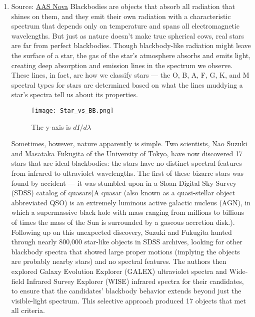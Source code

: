 \documentclass{article}
\begin{document}
\begin{enumerate}
\item Source: \href{https://aasnova.org/2018/10/31/perfect-blackbodies-in-the-sky/}{AAS Nova} \parencite{suzuki2018blackbody}\newline
 Blackbodies are objects that absorb all radiation that shines on them, and they emit their own radiation with a characteristic spectrum that depends only on temperature and spans all electromagnetic wavelengths.\newline
 But just as nature doesn’t make true spherical cows, real stars are far from perfect blackbodies. \newline
 Though blackbody-like radiation might leave the surface of a star, the gas of the star’s atmosphere absorbs and emits light, creating deep absorption and emission lines in the spectrum we observe. These lines, in fact, are how we classify stars — the O, B, A, F, G, K, and M spectral types for stars are determined based on what the lines muddying a star’s spectra tell us about its properties.
 \begin{figure}[H]
 \caption{The y-axis is $dI/d\lambda$}
    \centering
    \texttt{[image: Star\_vs\_BB.png]}
    \end{figure}
 Sometimes, however, nature apparently is simple. Two scientists, Nao Suzuki and Masataka Fukugita of the University of Tokyo, have now discovered 17 stars that are ideal blackbodies: the stars have no distinct spectral features from infrared to ultraviolet wavelengths.\newline
 The first of these bizarre stars was found by accident — it was stumbled upon in a Sloan Digital Sky Survey (SDSS) catalog of quasars(A quasar (also known as a quasi-stellar object abbreviated QSO) is an extremely luminous active galactic nucleus (AGN), in which a supermassive black hole with mass ranging from millions to billions of times the mass of the Sun is surrounded by a gaseous accretion disk.). Following up on this unexpected discovery, Suzuki and Fukugita hunted through nearly 800,000 star-like objects in SDSS archives, looking for other blackbody spectra that showed large proper motions (implying the objects are probably nearby stars) and no spectral features.\newline
 The authors then explored Galaxy Evolution Explorer (GALEX) ultraviolet spectra and Wide-field Infrared Survey Explorer (WISE) infrared spectra for their candidates, to ensure that the candidates’ blackbody behavior extends beyond just the visible-light spectrum. This selective approach produced 17 objects that met all criteria.\newline

\end{enumerate}
\end{document}

